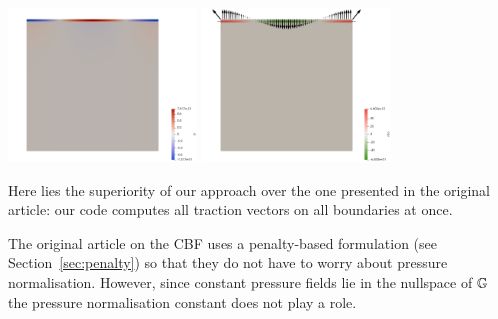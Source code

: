\begin{center}
\includegraphics[width=5cm]{python_codes/fieldstone_27/results/63_64/p}
\includegraphics[width=5cm]{python_codes/fieldstone_27/results/63_64/tractions}
\end{center}

Here lies the superiority of our approach over the one presented in the original article: 
our code computes all traction vectors on all boundaries at once.




\begin{remark}
The original article on the CBF \cite{zhgh93} uses a penalty-based formulation (see Section~\ref{sec:penalty})
so that they do not have to worry about pressure normalisation. However, since constant pressure fields lie 
in the nullspace of ${\mathbb{G}}$ the pressure normalisation constant does not play a role.
\end{remark}

